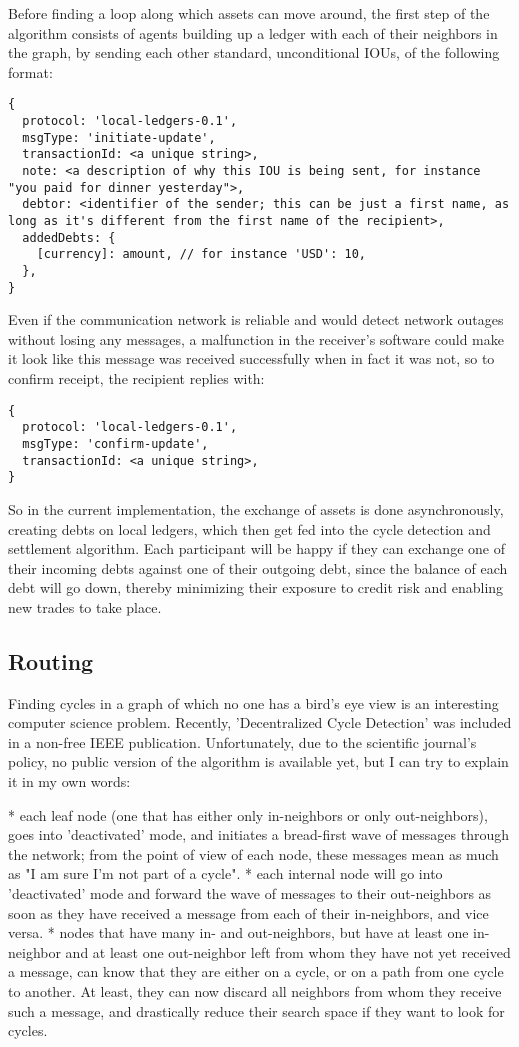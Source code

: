 \documentclass[11pt,twoside,a4paper]{article}
\begin{document}
Before finding a loop along which assets can move around, the first step of the algorithm consists of agents building up a ledger with each of their neighbors in the graph, by sending each other standard, unconditional IOUs, of the following format:
\begin{lstlisting}
{
  protocol: 'local-ledgers-0.1',
  msgType: 'initiate-update',
  transactionId: <a unique string>,
  note: <a description of why this IOU is being sent, for instance "you paid for dinner yesterday">,
  debtor: <identifier of the sender; this can be just a first name, as long as it's different from the first name of the recipient>,
  addedDebts: {
    [currency]: amount, // for instance 'USD': 10,
  },
}
\end{lstlisting}

Even if the communication network is reliable and would detect network outages without losing any messages, a malfunction in the receiver's software could make it look like this message was received successfully when in fact it was not, so to confirm receipt, the recipient replies with:
\begin{lstlisting}
{
  protocol: 'local-ledgers-0.1',
  msgType: 'confirm-update',
  transactionId: <a unique string>,
}
\end{lstlisting}

So in the current implementation, the exchange of assets is done asynchronously, creating debts on local ledgers, which then get fed into the cycle detection and settlement algorithm. Each participant will be happy if they can exchange one of their incoming debts against one of their outgoing debt, since the balance of each debt will go down, thereby minimizing their exposure to credit risk and enabling new trades to take place.

\subsection{Routing}

Finding cycles in a graph of which no one has a bird's eye view is an interesting computer science problem. Recently, 'Decentralized Cycle Detection' was included in a non-free IEEE publication. Unfortunately, due to the scientific journal's policy, no public version of the algorithm is available yet, but I can try to explain it in my own words:

* each leaf node (one that has either only in-neighbors or only out-neighbors), goes into 'deactivated' mode, and initiates a bread-first wave of messages through the network; from the point of view of each node, these messages mean as much as "I am sure I'm not part of a cycle".
* each internal node will go into 'deactivated' mode and forward the wave of messages to their out-neighbors as soon as they have received a message from each of their in-neighbors, and vice versa.
* nodes that have many in- and out-neighbors, but have at least one in-neighbor and at least one out-neighbor left from whom they have not yet received a message, can know that they are either on a cycle, or on a path from one cycle to another. At least, they can now discard all neighbors from whom they receive such a message, and drastically reduce their search space if they want to look for cycles.
\end{document}
